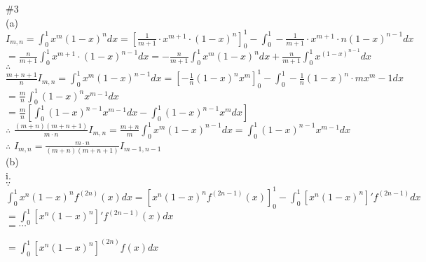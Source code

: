\documentclass{article}
\begin{document}
\vskip 3cm

\textcolor[rgb]{0.00,0.00,0.50}{\#3}\\

(a)\\

$\displaystyle I_{m,n} = \int_0^1 x^m (1-x)^n dx = \left[\frac{1}{m+1} \cdot x^{m+1} \cdot (1-x)^n\right]_0^1 - \int_0^1 -\frac{1}{m+1} \cdot x^{m+1} \cdot n(1-x)^{n-1} dx$\\

\hskip 0.777cm $\displaystyle = \frac{n}{m+1} \int_0^1 x^{m+1} \cdot (1-x)^{n-1} dx = -\frac{n}{m+1} \int_0^1 x^m (1-x)^n dx + \frac{n}{m+1} \int_0^1 x^ (1-x)^{n-1} dx$\\

$\therefore$ \qquad $\displaystyle \frac{m+n+1}{n}I_{m,n} = \int_0^1 x^m (1-x)^{n-1} dx = \left[-\frac{1}{n} (1-x)^n x^m\right]_0^1 - \int_0^1 -\frac{1}{n} (1-x)^n \cdot mx^m-1 dx$\\

\hskip 3.485cm $\displaystyle = \frac{m}{n} \int_0^1 (1-x)^n x^{m-1} dx$\\

\hskip 3.485cm $\displaystyle = \frac{m}{n} \left[\int_0^1 (1-x)^{n-1} x^{m-1} dx - \int_0^1 (1-x)^{n-1} x^m dx\right]$\\

$\therefore$ \qquad $\displaystyle \frac{(m+n)(m+n+1)}{m \cdot n} I_{m,n} = \frac{m+n}{m} \int_0^1 x^m (1-x)^{n-1} dx = \int_0^1 (1-x)^{n-1} x^{m-1} dx$\\

$\therefore$ \qquad $\displaystyle I_{m,n} = \frac{m \cdot n}{(m+n)(m+n+1)} I_{m-1,n-1}$\\

(b)\\

i.\\

$\because$ \qquad $\int_0^1 x^n (1-x)^n f^{(2n)}(x) dx = \left[x^n (1-x)^n f^{(2n-1)}(x)\right]_0^1 - \int_0^1\left[x^n (1-x)^n \right]' f^{(2n-1)} dx$\\

\hskip 4.87653cm $\displaystyle = \int_0^1 \left[x^n (1-x)^n\right]' f^{(2n-1)}(x) dx$\\

\hskip 4.87653cm $\displaystyle = \cdots$

\hskip 4.87653cm $\displaystyle = \int_0^1 \left[x^n (1-x)^n\right]^{(2n)} f(x) dx$\\
\end{document}
